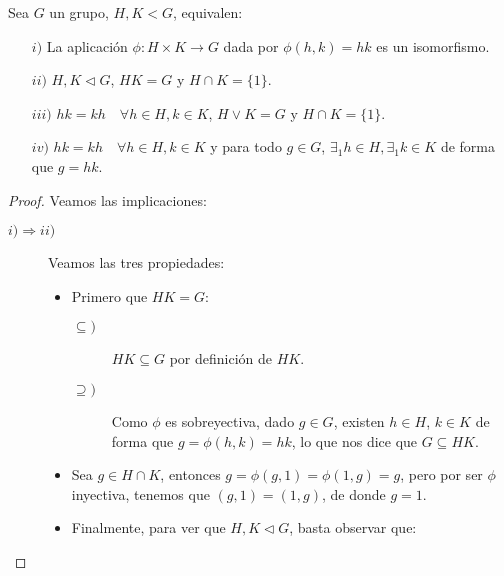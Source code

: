 \begin{teo}\label{teo:carac_prod_interno}
    Sea $G$ un grupo, $H,K<G$, equivalen:
    \begin{enumerate}
        \item[$i)$] La aplicación $\phi:H\times K\to G$ dada por $\phi(h,k) = hk$ es un isomorfismo.
        \item[$ii)$] $H,K\lhd G$, $HK = G$ y $H\cap K = \{1\}$.
        \item[$iii)$] $hk = kh \quad \forall h\in H, k\in K$, $H\lor K = G$ y $H\cap K = \{1\}$.
        \item[$iv)$] $hk = kh \quad \forall h\in H, k\in K$ y para todo $g\in G$, $\exists_1 h\in H, \exists_1 k\in K$ de forma que $g = hk$. 
    \end{enumerate}
    \begin{proof}
        Veamos las implicaciones:
        \begin{description}
            \item [$i)\Longrightarrow ii)$] Veamos las tres propiedades:
                \begin{itemize}
                    \item Primero que $HK = G$:
                        \begin{description}
                            \item [$\subseteq)$] $HK\subseteq G$ por definición de $HK$.
                            \item [$\supseteq)$] Como $\phi$ es sobreyectiva, dado $g\in G$, existen $h\in H$, $k\in K$ de forma que $g = \phi(h,k) = hk$, lo que nos dice que $G \subseteq  HK$. 
                        \end{description}
                    \item Sea $g\in H\cap K$, entonces $g = \phi(g,1) = \phi(1,g) = g$, pero por ser $\phi$ inyectiva, tenemos que $(g,1)=(1,g)$, de donde $g = 1$.
                    \item Finalmente, para ver que $H,K\lhd G$, basta observar que:
                        \begin{figure}[H]
                            \centering
\end{figure}
\end{itemize}
\end{description}
\end{proof}
\end{teo}
